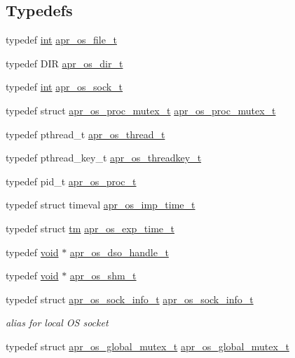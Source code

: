\subsection*{Typedefs}
\begin{DoxyCompactItemize}
\item 
typedef \hyperlink{pcre_8txt_a42dfa4ff673c82d8efe7144098fbc198}{int} \hyperlink{group__apr__portabile_ga885491b889a4a719549650d3a370fd34}{apr\+\_\+os\+\_\+file\+\_\+t}
\item 
typedef D\+IR \hyperlink{group__apr__portabile_gacb790646cfc3da1b43a5f7c4bfaa3937}{apr\+\_\+os\+\_\+dir\+\_\+t}
\item 
typedef \hyperlink{pcre_8txt_a42dfa4ff673c82d8efe7144098fbc198}{int} \hyperlink{group__apr__portabile_ga2965cd2e48cb6513bc0ba05aa6083ed7}{apr\+\_\+os\+\_\+sock\+\_\+t}
\item 
typedef struct \hyperlink{structapr__os__proc__mutex__t}{apr\+\_\+os\+\_\+proc\+\_\+mutex\+\_\+t} \hyperlink{group__apr__portabile_ga107413a26e947456cabfcab99b8a7ade}{apr\+\_\+os\+\_\+proc\+\_\+mutex\+\_\+t}
\item 
typedef pthread\+\_\+t \hyperlink{group__apr__portabile_ga4ccd9519af148ccf9cff850dd58f00b6}{apr\+\_\+os\+\_\+thread\+\_\+t}
\item 
typedef pthread\+\_\+key\+\_\+t \hyperlink{group__apr__portabile_ga0a228496d8a1a9b3be744ddb101a3e76}{apr\+\_\+os\+\_\+threadkey\+\_\+t}
\item 
typedef pid\+\_\+t \hyperlink{group__apr__portabile_ga2ce5962de629ee6528081813c6b60e2e}{apr\+\_\+os\+\_\+proc\+\_\+t}
\item 
typedef struct timeval \hyperlink{group__apr__portabile_ga6d27e476300cd1d3fda24e1ff0e358e1}{apr\+\_\+os\+\_\+imp\+\_\+time\+\_\+t}
\item 
typedef struct \hyperlink{pcretest_8txt_aa2e3274466b5ab2887d8d52dd8a50e8d}{tm} \hyperlink{group__apr__portabile_ga0fa9349212690591b09a0cbea7b61bdd}{apr\+\_\+os\+\_\+exp\+\_\+time\+\_\+t}
\item 
typedef \hyperlink{group__MOD__ISAPI_gacd6cdbf73df3d9eed42fa493d9b621a6}{void} $\ast$ \hyperlink{group__apr__portabile_ga542684803ee8ab0abd69077697599ec0}{apr\+\_\+os\+\_\+dso\+\_\+handle\+\_\+t}
\item 
typedef \hyperlink{group__MOD__ISAPI_gacd6cdbf73df3d9eed42fa493d9b621a6}{void} $\ast$ \hyperlink{group__apr__portabile_ga7af1085d6390fbd08d66482b8c17de51}{apr\+\_\+os\+\_\+shm\+\_\+t}
\item 
typedef struct \hyperlink{structapr__os__sock__info__t}{apr\+\_\+os\+\_\+sock\+\_\+info\+\_\+t} \hyperlink{group__apr__portabile_gaece2b8b41cbb949590896b47daaa9fd2}{apr\+\_\+os\+\_\+sock\+\_\+info\+\_\+t}
\begin{DoxyCompactList}\small\item\em alias for local OS socket \end{DoxyCompactList}\item 
typedef struct \hyperlink{structapr__os__global__mutex__t}{apr\+\_\+os\+\_\+global\+\_\+mutex\+\_\+t} \hyperlink{group__apr__portabile_gadf7b676b7a604bbaa2bc9c4257b05682}{apr\+\_\+os\+\_\+global\+\_\+mutex\+\_\+t}
\end{DoxyCompactItemize}

